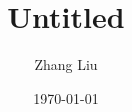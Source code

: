 \documentclass[11pt,reqno,oneside,a4paper]{article}
\author{Zhang Liu}
\title{Untitled}
\date{\today}   %
\begin{document}
\maketitle
\thispagestyle{fancy}

\begin{abstract}
\end{abstract}


{\small}
\end{document}

